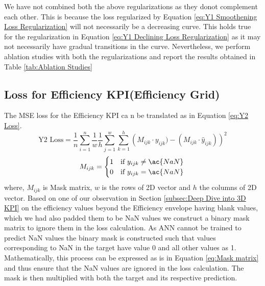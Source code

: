 \documentclass{report} %
\begin{document}
We have not combined both the above regularizations as they donot complement each other. This is because the loss regularized by Equation 
\ref{eq:Y1 Smoothening Loss Regularization} will not necessarily be a decreasing curve.
This holds true for the regularization in Equation \ref{eq:Y1 Declining Loss Regularization} as it may not necessarily have gradual transitions in the curve.
Nevertheless, we perform ablation studies with both the regularizations and report the results obtained in Table \ref{tab:Ablation Studies}

\subsection{Loss for Efficiency \ac{KPI}(Efficiency Grid)}\label{sec:Loss for 3D KPI}

The \ac{MSE} loss for the Efficiency \ac{KPI} ca n be translated as in Equation \ref{eq:Y2 Loss}.
\begin{equation}
\text{Y2 Loss} = \frac{1}{n} \sum_{i=1}^{n} \frac{1}{w} \frac{1}{h} \sum_{j=1}^{w} \sum_{k=1}^{h} \left( M_{ijk} \cdot y_{ijk}) - (M_{ijk} \cdot \hat{y}_{ijk})\right)^2
\label{eq:Y2 Loss}
\end{equation}
\begin{equation}
    M_{ijk} = \begin{cases}
        1 & \text{if } y_{ijk} \neq \ac{NaN} \\
        0 & \text{if } y_{ijk} = \ac{NaN} 
        \end{cases} \\
\label{eq:Mask matrix}
\end{equation}
where, \(M_{ijk}\) is Mask matrix, \(w\) is the rows of 2\ac{D} vector and \(h\) the columns of 2\ac{D} vector.
Based on one of our observation in Section \ref{subsec:Deep Dive into 3D KPI} on the efficiency values beyond the Efficiency envelope having blank values, 
which we had also padded them to be \ac{NaN} values we construct a binary mask matrix to ignore them in the loss calculation.
As ANN cannot be trained to predict \ac{NaN} values the binary mask is constructed such that values corresponding to \ac{NaN} in the target have value 0 and all other values as 1.
Mathematically, this process can be expressed as is in Equation \ref{eq:Mask matrix} and thus ensure that the \ac{NaN} values are ignored in the loss calculation. 
The mask is then multiplied with both the target and its respective prediction. 
\end{document}
